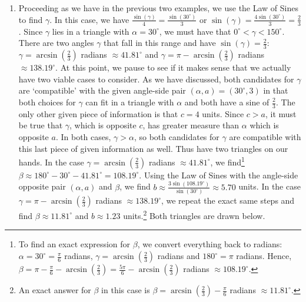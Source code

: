 \begin{ex}
\begin{enumerate}
\item  Proceeding as we have in the previous two examples, we use the Law of Sines to find $\gamma$.  In this case, we have $\frac{\sin(\gamma)}{4} = \frac{\sin\left(30^{\circ}\right)}{3}$ or $\sin(\gamma) = \frac{4\sin\left(30^{\circ}\right)}{3} = \frac{2}{3}$.  Since $\gamma$ lies in a triangle with $\alpha = 30^{\circ}$, we must have that $0^{\circ} < \gamma < 150^{\circ}$.   There are two angles $\gamma$ that fall in this range and have $\sin(\gamma) = \frac{2}{3}$:  $\gamma = \arcsin\left(\frac{2}{3}\right)$ radians $\approx 41.81^{\circ}$ and $\gamma = \pi - \arcsin\left(\frac{2}{3}\right)$ radians $\approx 138.19^{\circ}$. At this point, we pause to see if it makes sense that we actually have two viable cases to consider. As we have discussed, both candidates for $\gamma$ are `compatible' with the given angle-side pair $(\alpha, a) = \left(30^{\circ}, 3\right)$ in that both choices for $\gamma$ can fit in a triangle with $\alpha$ and both have a sine of $\frac{2}{3}$.  The only other given piece of information is that $c = 4$ units.  Since $c > a$, it must be true that $\gamma$, which is opposite $c$, has greater measure than $\alpha$ which is opposite $a$.  In both cases, $\gamma > \alpha$, so both candidates for $\gamma$ are compatible with this last piece of given information as well.  Thus have two triangles on our hands.  In the case $\gamma = \arcsin\left(\frac{2}{3}\right)$ radians $\approx 41.81^{\circ}$, we find\footnote{To find an exact expression for $\beta$, we convert everything back to radians:  $\alpha = 30^{\circ} = \frac{\pi}{6}$ radians, $\gamma = \arcsin\left(\frac{2}{3}\right)$ radians and $180^{\circ} = \pi$ radians.  Hence, $\beta = \pi - \frac{\pi}{6} - \arcsin\left(\frac{2}{3}\right) = \frac{5\pi}{6} - \arcsin\left(\frac{2}{3}\right)$ radians $\approx 108.19^{\circ}$.} $\beta \approx 180^{\circ} - 30^{\circ} - 41.81^{\circ}  = 108.19^{\circ}$.  Using the Law of Sines with the angle-side opposite pair $(\alpha, a)$ and $\beta$, we find $b \approx \frac{3 \sin\left(108.19^{\circ}\right)}{\sin\left(30^{\circ}\right)} \approx 5.70$ units.  In the case $\gamma = \pi - \arcsin\left(\frac{2}{3}\right)$ radians $\approx 138.19^{\circ}$, we repeat the exact same steps and find $\beta \approx 11.81^{\circ}$ and $b \approx 1.23$ units.\footnote{An exact answer for $\beta$ in this case is $\beta = \arcsin\left(\frac{2}{3}\right) - \frac{\pi}{6}$ radians $\approx 11.81^{\circ}$.} Both triangles are drawn below.

\begin{center}


\end{center}
\end{enumerate}
\end{ex}
